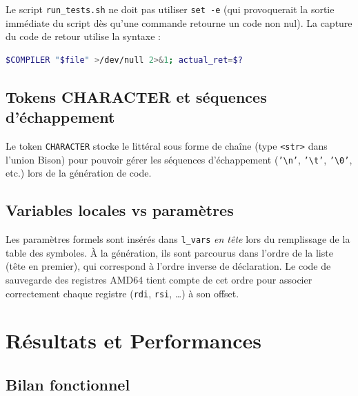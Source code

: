 \documentclass[12pt,a4paper]{article}
\begin{document}
Le script \texttt{run\_tests.sh} ne doit pas utiliser \texttt{set -e} (qui
provoquerait la sortie immédiate du script dès qu'une commande retourne un
code non nul). La capture du code de retour utilise la syntaxe :

\begin{lstlisting}[language=bash]
$COMPILER "$file" >/dev/null 2>&1; actual_ret=$?
\end{lstlisting}

\subsection{Tokens CHARACTER et séquences d'échappement}

Le token \texttt{CHARACTER} stocke le littéral sous forme de chaîne (type
\texttt{<str>} dans l'union Bison) pour pouvoir gérer les séquences
d'échappement (\texttt{'\textbackslash n'}, \texttt{'\textbackslash t'},
\texttt{'\textbackslash 0'}, etc.) lors de la génération de code.

\subsection{Variables locales vs paramètres}

Les paramètres formels sont insérés dans \texttt{l\_vars} \textit{en tête}
lors du remplissage de la table des symboles. À la génération, ils sont
parcourus dans l'ordre de la liste (tête en premier), qui correspond à
l'ordre inverse de déclaration. Le code de sauvegarde des registres AMD64
tient compte de cet ordre pour associer correctement chaque registre
(\texttt{rdi}, \texttt{rsi}, …) à son offset.

\section{Résultats et Performances}

\subsection{Bilan fonctionnel}
\end{document}
